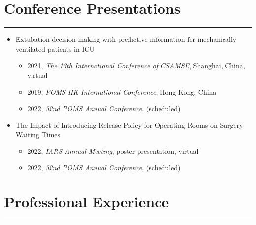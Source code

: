\documentclass[12pt, a4paper]{article}
\begin{document}
{\section*{Conference Presentations}
\vspace*{0.4em}
\hrule height 0.5pt
\begin{itemize}[leftmargin=36pt, itemsep=6pt, parsep=0.2pt, topsep=1pt]

	\item Extubation decision making with predictive information for mechanically ventilated patients in ICU

	\begin{itemize}[leftmargin=20pt, itemsep=2pt, topsep=2pt]

		\item 2021, {\it The 13th International Conference of CSAMSE}, Shanghai, China, virtual

		\item 2019, {\it POMS-HK International Conference}, Hong Kong, China
		
		\item 2022, {\it 32nd POMS Annual Conference}, (scheduled)

	\end{itemize}

	\item The Impact of Introducing Release Policy for Operating Rooms on Surgery Waiting Times

	\begin{itemize}
		
		\item 2022, {\it IARS Annual Meeting}, poster presentation, virtual

		\item 2022, {\it 32nd POMS Annual Conference}, (scheduled)
	
	\end{itemize}

\end{itemize}




\section*{Professional Experience}
\vspace*{0.4em}
\hrule height 0.5pt
\begin{itemize}[leftmargin=36pt, itemsep=0pt, parsep=0.2pt, topsep=1pt]


\end{itemize}}
\end{document}

